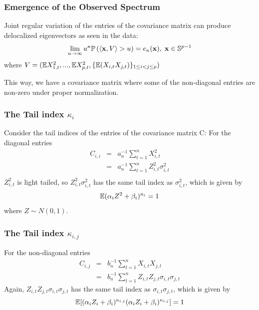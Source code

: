 \documentclass{beamer}
\begin{document}
\begin{frame}
  \frametitle{Emergence of the Observed Spectrum}
  Joint regular variation of the entries of the covariance matrix can
  produce delocalized eigenvectors as seen in the data:
  \[
  \lim_{u \to \infty} u^{\kappa}
  \mathbb{P}\left(
    \langle\mathbf{x}, V\rangle > u
  \right) = e_{\kappa}(\mathbf{x}),\; \mathbf{x} \in \mathbb S^{p-1}
  \]
  where $V=(\mathbb{E} X_{1,t}^2, ..., \mathbb{E} X_{p,t}^2,
  \{\mathbb{E} (X_{i,t}X_{j,t})\}_{1 \leq i < j \leq p})$

  This way, we have a covariance matrix where some of the non-diagonal
  entries are non-zero under proper normalization.
\end{frame}

\begin{frame}
  \frametitle{The Tail index $\kappa_i$}
  Consider the tail indices of the entries of the covariance matrix C:
  For the diagonal entries
    \begin{eqnarray*}
      C_{i, i} &=& a_n^{-1} \sum_{t=1}^n X_{i, t}^2 \\
      &=& a_n^{-1} \sum_{t=1}^n Z_{i, t}^2 \sigma_{i, t}^2 \\
    \end{eqnarray*}
    $Z_{i, t}^2$ is light tailed, so $Z_{i, t}^2 \sigma_{i, t}^2$ has
    the same tail index as $\sigma_{i, t}^2$, which is given by
    \[
    \mathbb{E} (\alpha_i Z^2 + \beta_i)^{\kappa_i} = 1
    \]
    where $Z \sim N(0, 1)$.
  \end{frame}

  \begin{frame}
  \frametitle{The Tail index $\kappa_{i,j}$}
    For the non-diagonal entries
    \begin{eqnarray*}
      C_{i, j} &=& b_n^{-1} \sum_{t=1}^n X_{i, t} X_{j, t} \\
      &=& b_n^{-1} \sum_{t=1}^n Z_{i, t} Z_{j, t} \sigma_{i, t} \sigma_{j, t}
    \end{eqnarray*}
    Again, $Z_{i, t} Z_{j, t} \sigma_{i, t} \sigma_{j, t}$ has the
    same tail index as $\sigma_{i, t} \sigma_{j, t}$, which is given
    by
    \[
    \mathbb{E} [(\alpha_i Z_i + \beta_i)^{\kappa_{i,j}}(\alpha_i Z_i +
    \beta_i)^{\kappa_{i,j}}] = 1
    \]
  \end{frame}


\end{document}
